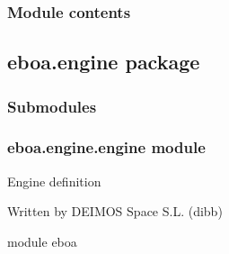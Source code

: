 \subsubsection{Module contents}
\label{\detokenize{eboa.datamodel:module-eboa.datamodel}}\label{\detokenize{eboa.datamodel:module-contents}}

\subsection{eboa.engine package}
\label{\detokenize{eboa.engine:eboa-engine-package}}\label{\detokenize{eboa.engine::doc}}

\subsubsection{Submodules}
\label{\detokenize{eboa.engine:submodules}}

\subsubsection{eboa.engine.engine module}
\label{\detokenize{eboa.engine:module-eboa.engine.engine}}\label{\detokenize{eboa.engine:eboa-engine-engine-module}}
Engine definition

Written by DEIMOS Space S.L. (dibb)

module eboa

